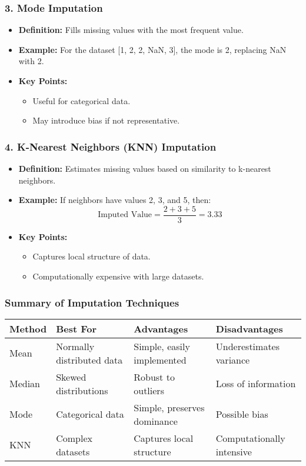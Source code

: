 \documentclass[aspectratio=169]{beamer}
\begin{document}
\begin{frame}[fragile]
    \frametitle{3. Mode Imputation}
    \begin{itemize}
        \item \textbf{Definition:} Fills missing values with the most frequent value.
        \item \textbf{Example:} For the dataset [1, 2, 2, NaN, 3], the mode is 2, replacing NaN with 2.
        \item \textbf{Key Points:}
        \begin{itemize}
            \item Useful for categorical data.
            \item May introduce bias if not representative.
        \end{itemize}
    \end{itemize}
\end{frame}

\begin{frame}[fragile]
    \frametitle{4. K-Nearest Neighbors (KNN) Imputation}
    \begin{itemize}
        \item \textbf{Definition:} Estimates missing values based on similarity to k-nearest neighbors.
        \item \textbf{Example:} If neighbors have values 2, 3, and 5, then:
        \begin{equation}
            \text{Imputed Value} = \frac{2 + 3 + 5}{3} = 3.33
        \end{equation}
        \item \textbf{Key Points:}
        \begin{itemize}
            \item Captures local structure of data.
            \item Computationally expensive with large datasets.
        \end{itemize}
    \end{itemize}
\end{frame}

\begin{frame}[fragile]
    \frametitle{Summary of Imputation Techniques}
    \begin{tabular}{|l|l|l|l|}
        \hline
        \textbf{Method} & \textbf{Best For} & \textbf{Advantages} & \textbf{Disadvantages} \\
        \hline
        Mean & Normally distributed data & Simple, easily implemented & Underestimates variance \\
        \hline
        Median & Skewed distributions & Robust to outliers & Loss of information \\
        \hline
        Mode & Categorical data & Simple, preserves dominance & Possible bias \\
        \hline
        KNN & Complex datasets & Captures local structure & Computationally intensive \\
        \hline
    \end{tabular}
\end{frame}
\end{document}

